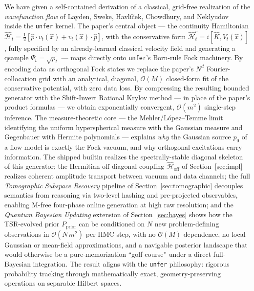 \documentclass[11pt, a4paper]{article}
\newcommand{\Hgen}{\hat{\mathcal{H}}}
\newcommand{\Kop}{\hat{K}}
\begin{document}
We have given a self-contained derivation of a classical, grid-free realization
of the \emph{wavefunction flow} of Layden, Sweke, Havl\'i\v{c}ek, Chowdhury, and
Neklyudov~\cite{Layden2025} inside the \texttt{unfer} kernel. The paper's
central object --- the continuity Hamiltonian
$\Hgen_t=\tfrac12[\hat p\cdot v_t(\hat x)+v_t(\hat x)\cdot\hat p]$, with the
conservative form $\Hgen_t^c=i[\Kop,V_t(\hat x)]$, fully specified by an
already-learned classical velocity field and generating a qsample
$\Psi_t=\sqrt{p_t}$ --- maps directly onto \texttt{unfer}'s Born-rule Fock
machinery. By encoding data as orthogonal Fock states we replace the paper's
$N^d$ Fourier-collocation grid with an analytical, diagonal,
$\mathcal{O}(M)$ closed-form fit of the conservative potential, with zero data
loss. By compressing the resulting bounded generator with the Shift-Invert
Rational Krylov method --- in place of the paper's product formulas --- we
obtain exponentially convergent, $\mathcal{O}(m^2)$ single-step inference. The
measure-theoretic core --- the Mehler/L\'opez--Temme limit identifying the
uniform hyperspherical measure with the Gaussian measure and Gegenbauer with
Hermite polynomials --- explains \emph{why} the Gaussian source $p_0$ of a flow
model is exactly the Fock vacuum, and why orthogonal excitations carry
information. The shipped builtin realizes the spectrally-stable diagonal
skeleton of this generator; the Hermitian off-diagonal coupling
$\Hgen_{\mathrm{off}}$ of Section~\ref{sec:impl} realizes coherent amplitude
transport between vacuum and data channels; the full \emph{Tomographic
Subspace Recovery} pipeline of Section~\ref{sec:tomographic} decouples
semantics from reasoning via two-level hashing and pre-projected observables,
enabling M-free four-phase online generation at high raw resolution; and the
\emph{Quantum Bayesian Updating} extension of Section~\ref{sec:bayes} shows how
the TSR-evolved prior $P_{\mathrm{prior}}$ can be conditioned on $N$ new
problem-defining observations in $\mathcal{O}(N\,m^2)$ per HMC step, with
no $\mathcal{O}(M)$ dependence, no local Gaussian or mean-field
approximations, and a navigable posterior landscape that would otherwise be
a pure-memorization ``golf course'' under a direct full-Bayesian
integration. The result aligns with the \texttt{unfer} philosophy: rigorous
probability tracking through mathematically exact, geometry-preserving
operations on
separable Hilbert spaces.
\end{document}
